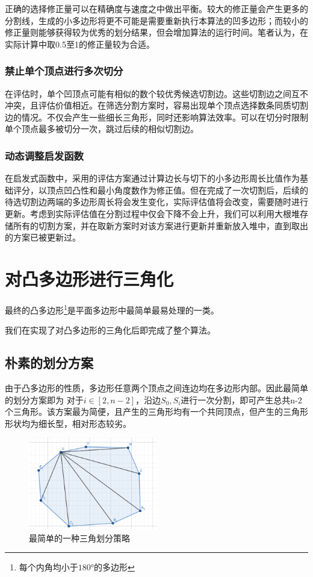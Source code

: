 正确的选择修正量可以在精确度与速度之中做出平衡。较大的修正量会产生更多的分割线，生成的小多边形将更不可能是需要重新执行本算法的凹多边形；而较小的修正量则能够获得较为优秀的划分结果，但会增加算法的运行时间。笔者认为，在实际计算中取0.5至1的修正量较为合适。

\subsubsection{禁止单个顶点进行多次切分}
在评估时，单个凹顶点可能有相似的数个较优秀候选切割边。这些切割边之间互不冲突，且评估价值相近。在筛选分割方案时，容易出现单个顶点选择数条同质切割边的情况。不仅会产生一些细长三角形，同时还影响算法效率。可以在切分时限制单个顶点最多被切分一次，跳过后续的相似切割边。
\subsubsection{动态调整启发函数}
在启发式函数中，采用的评估方案通过计算边长与切下的小多边形周长比值作为基础评分，以顶点凹凸性和最小角度数作为修正值。但在完成了一次切割后，后续的待选切割边两端的多边形周长将会发生变化，实际评估值将会改变，需要随时进行更新。考虑到实际评估值在分割过程中仅会下降不会上升，我们可以利用大根堆存储所有的切割方案，并在取新方案时对该方案进行更新并重新放入堆中，直到取出的方案已被更新过。

\section{对凸多边形进行三角化}\label{sec:对凸多边形进行三角化}

最终的凸多边形\footnote{每个内角均小于\(180°\)的多边形}是平面多边形中最简单最易处理的一类。

我们在实现了对凸多边形的三角化后即完成了整个算法。

\subsection{朴素的划分方案}

由于凸多边形的性质，多边形任意两个顶点之间连边均在多边形内部。因此最简单的划分方案即为 对于\(i\in [2,n-2]\)，沿边\(S_0,S_i\)进行一次分割，即可产生总共n-2个三角形。该方案最为简便，且产生的三角形均有一个共同顶点，但产生的三角形形状均为细长型，相对形态较劣。
\begin{figure}[htp]
    \centering
    \includegraphics[width=0.5\textwidth]
    {figures/凸多边形1.png}
    \caption{最简单的一种三角划分策略}
  \end{figure}

